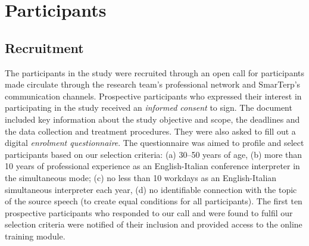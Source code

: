\section{Participants}


\subsection{Recruitment}


The participants in the study were recruited through an open call for participants made circulate through the research team’s professional network and SmarTerp’s communication channels. Prospective participants who expressed their interest in participating in the study received an \textit{informed consent} to sign. The document included key information about the study objective and scope, the deadlines and the data collection and treatment procedures. They were also asked to fill out a digital \textit{enrolment questionnaire}. The questionnaire was aimed to profile and select participants based on our selection criteria: (a) 30--50 years of age, (b) more than 10 years of professional experience as an English-Italian conference interpreter in the simultaneous mode; (c) no less than 10 workdays as an English-Italian simultaneous interpreter each year, (d) no identifiable connection with the topic of the source speech (to create equal conditions for all participants). The first ten prospective participants who responded to our call and were found to fulfil our selection criteria were notified of their inclusion and provided access to the online training module.

